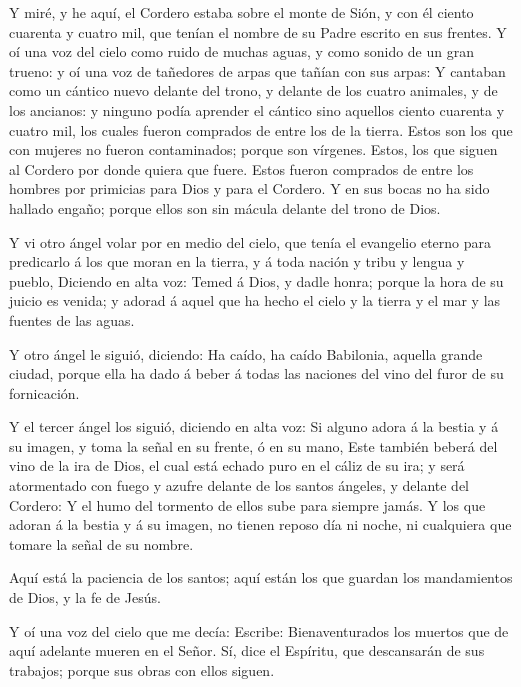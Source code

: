  Y miré, y he aquí, el Cordero estaba sobre el monte de
Sión, y con él ciento cuarenta y cuatro mil, que tenían el nombre de su
Padre escrito en sus frentes.  Y oí una voz del cielo como
ruido de muchas aguas, y como sonido de un gran trueno: y oí una voz de
tañedores de arpas que tañían con sus arpas:  Y cantaban
como un cántico nuevo delante del trono, y delante de los cuatro
animales, y de los ancianos: y ninguno podía aprender el cántico sino
aquellos ciento cuarenta y cuatro mil, los cuales fueron comprados de
entre los de la tierra.  Estos son los que con mujeres no
fueron contaminados; porque son vírgenes. Estos, los que siguen al
Cordero por donde quiera que fuere. Estos fueron comprados de entre los
hombres por primicias para Dios y para el Cordero.  Y en sus
bocas no ha sido hallado engaño; porque ellos son sin mácula delante del
trono de Dios.

 Y vi otro ángel volar por en medio del cielo, que tenía el
evangelio eterno para predicarlo á los que moran en la tierra, y á toda
nación y tribu y lengua y pueblo,  Diciendo en alta voz:
Temed á Dios, y dadle honra; porque la hora de su juicio es venida; y
adorad á aquel que ha hecho el cielo y la tierra y el mar y las fuentes
de las aguas.

 Y otro ángel le siguió, diciendo: Ha caído, ha caído
Babilonia, aquella grande ciudad, porque ella ha dado á beber á todas
las naciones del vino del furor de su fornicación.

 Y el tercer ángel los siguió, diciendo en alta voz: Si
alguno adora á la bestia y á su imagen, y toma la señal en su frente, ó
en su mano,  Este también beberá del vino de la ira de
Dios, el cual está echado puro en el cáliz de su ira; y será atormentado
con fuego y azufre delante de los santos ángeles, y delante del Cordero:
 Y el humo del tormento de ellos sube para siempre jamás. Y
los que adoran á la bestia y á su imagen, no tienen reposo día ni noche,
ni cualquiera que tomare la señal de su nombre.

 Aquí está la paciencia de los santos; aquí están los que
guardan los mandamientos de Dios, y la fe de Jesús.

 Y oí una voz del cielo que me decía: Escribe:
Bienaventurados los muertos que de aquí adelante mueren en el Señor. Sí,
dice el Espíritu, que descansarán de sus trabajos; porque sus obras con
ellos siguen.

